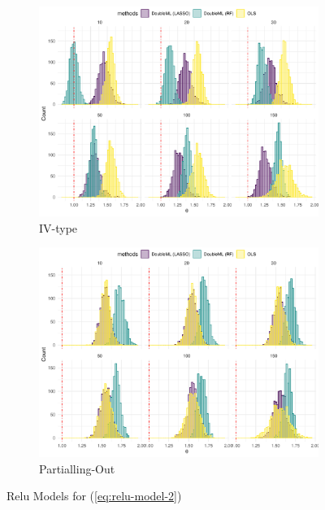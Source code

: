 \documentclass[en,12pt,mtpro2]{elegantpaper}
\begin{document}
\begin{figure}[htp]
    \centering
    \begin{subfigure}{.41\textwidth}
        \centering
        \includegraphics[width=\linewidth]{figures/simulation-relu6 (IV-type).pdf}
        \caption{IV-type}
    \end{subfigure}
    \begin{subfigure}{.41\textwidth}
        \centering
        \includegraphics[width=\linewidth]{figures/simulation-relu6 (partialling out).pdf}
        \caption{Partialling-Out}
    \end{subfigure}
    \caption{Relu Models for (\ref{eq:relu-model-2})}
\end{figure}
\clearpage
\end{document}

